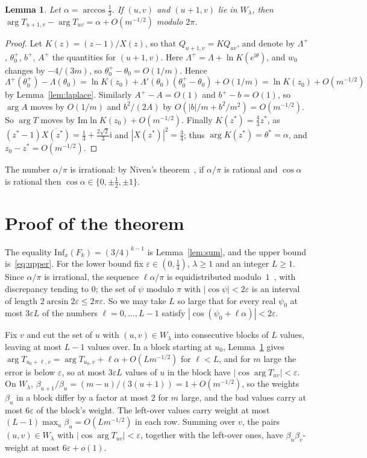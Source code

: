 \documentclass[11pt]{amsart}
\newtheorem{lemma}[theorem]{Lemma}
\theoremstyle{remark}
\newcommand{\Inf}{\mathrm{Inf}}
\newcommand{\ii}{\mathrm{i}}
\begin{document}
\begin{lemma}\label{lem:phase}
Let $\alpha=\arccos\frac13$. If $(u,v)$ and $(u+1,v)$ lie in $W_\lambda$, then
$\arg T_{u+1,v}-\arg T_{uv}=\alpha+O(m^{-1/2})$ modulo $2\pi$.
\end{lemma}

\begin{proof}
Let $K(z)=(z-1)/X(z)$, so that $Q_{u+1,v}=KQ_{uv}$, and denote by $\Lambda^+$, $\theta_0^+$, $b^+$, $A^+$ the
quantities for $(u+1,v)$. Here $\Lambda^+=\Lambda+\ln K(e^{\ii\theta})$, and $w_0$ changes by $-4/(3m)$, so
$\theta_0^+-\theta_0=O(1/m)$. Hence
\[
\Lambda^+(\theta_0^+)-\Lambda(\theta_0)=\ln K(z_0)+\Lambda'(\theta_0)(\theta_0^+-\theta_0)+O(1/m)=\ln K(z_0)+O(m^{-1/2})
\]
by Lemma~\ref{lem:laplace}. Similarly $A^+-A=O(1)$ and $b^+-b=O(1)$, so $\arg A$ moves by $O(1/m)$ and $b^2/(2A)$ by
$O(|b|/m+b^2/m^2)=O(m^{-1/2})$. So $\arg T$ moves by $\mathrm{Im}\ln K(z_0)+O(m^{-1/2})$. Finally
$K(z^*)=\frac43z^*$, as $(z^*-1)\overline{X(z^*)}=\frac13+\frac{2\sqrt2}3\ii$ and $|X(z^*)|^2=\frac34$; thus
$\arg K(z^*)=\theta^*=\alpha$, and $z_0-z^*=O(m^{-1/2})$.
\end{proof}

The number $\alpha/\pi$ is irrational: by Niven's theorem~\cite{Niv}, if $\alpha/\pi$ is rational and $\cos\alpha$ is
rational then $\cos\alpha\in\{0,\pm\frac12,\pm1\}$.

\section{Proof of the theorem}\label{sec:proof}

The equality $\Inf_x(F_k)=(3/4)^{k-1}$ is Lemma~\ref{lem:sum}, and the upper bound is~\eqref{eq:upper}. For the lower
bound fix $\varepsilon\in(0,\frac14)$, $\lambda\ge1$ and an integer $L\ge1$. Since $\alpha/\pi$ is irrational, the
sequence $\ell\alpha/\pi$ is equidistributed modulo~$1$~\cite{Weyl16}, with discrepancy tending to $0$; the set of $\psi$
modulo $\pi$ with $|\cos\psi|<2\varepsilon$ is an interval of length $2\arcsin2\varepsilon\le2\pi\varepsilon$. So we may
take $L$ so large that for every real $\psi_0$ at most $3\varepsilon L$ of the numbers $\ell=0,\dots,L-1$ satisfy
$|\cos(\psi_0+\ell\alpha)|<2\varepsilon$.

Fix $v$ and cut the set of $u$ with $(u,v)\in W_\lambda$ into consecutive blocks of $L$ values, leaving at most $L-1$
values over. In a block starting at $u_0$, Lemma~\ref{lem:phase} gives
$\arg T_{u_0+\ell,v}=\arg T_{u_0,v}+\ell\alpha+O(Lm^{-1/2})$ for $\ell<L$, and for $m$ large the error is below
$\varepsilon$, so at most $3\varepsilon L$ values of $u$ in the block have $|\cos\arg T_{uv}|<\varepsilon$. On
$W_\lambda$, $\beta_{u+1}/\beta_u=(m-u)/(3(u+1))=1+O(m^{-1/2})$, so the weights $\beta_u$ in a block differ by a factor
at most $2$ for $m$ large, and the bad values carry at most $6\varepsilon$ of the block's weight. The left-over values
carry weight at most $(L-1)\max_u\beta_u=O(Lm^{-1/2})$ in each row. Summing over $v$, the pairs $(u,v)\in W_\lambda$ with
$|\cos\arg T_{uv}|<\varepsilon$, together with the left-over ones, have $\beta_u\beta_v$-weight at most
$6\varepsilon+o(1)$.
\end{document}
